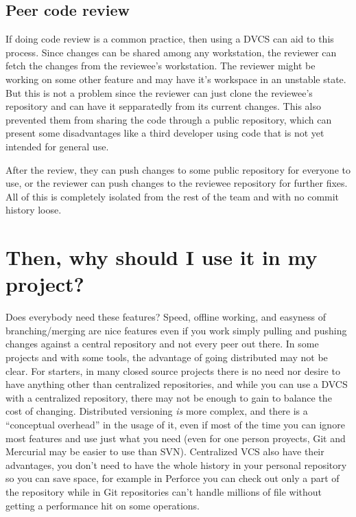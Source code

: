 \documentclass[%
	final,
	notitlepage,
	narroweqnarray,
	inline,
	twoside,
	]{ieee}
\begin{document}
\subsection{Peer code review}
If doing code review is a common practice, then using a DVCS can aid to this process. Since changes can be shared
among any workstation, the reviewer can fetch the changes from the reviewee's workstation. The reviewer might be
working on some other feature and may have it's workspace in an unstable state. But this is not a problem since the
reviewer can just clone the reviewee's repository and can have it sepparatedly from its current changes.
This also prevented them from sharing the code through a public repository, which can present some disadvantages like
a third developer using code that is not yet intended for general use.

After the review, they can push changes to some public repository for everyone to use, or the reviewer can push changes to the reviewee repository for further fixes. All of this is completely isolated from the rest of the team and with no commit history loose. 

\section{Then, why should I use it in my project?}
Does everybody need these features? Speed, offline working, 
and easyness of branching/merging are nice features even if you work simply pulling 
and pushing changes against a central repository and not every peer out there. In some 
projects and with some tools, the advantage of going distributed may not be clear. 
For starters, in many closed source projects there is no need nor desire to have anything
other than centralized repositories, and while you can use a DVCS with a centralized
repository, there may not be enough to gain to balance the cost of changing. Distributed 
versioning \emph{is} more complex, and there is a ``conceptual overhead'' in the usage 
of it, even if most of the time you can ignore most features and use just what you need 
(even for one person proyects, Git and Mercurial may be easier to use than SVN).
Centralized VCS also have their advantages, you don't need to have the whole history in your 
personal repository so you can save space, for example in Perforce you can check out only a part of the 
repository\cite{perforceclientspec} while in Git repositories can't handle millions of file 
without getting a performance hit on some operations\cite{linusgit}.
\end{document}
